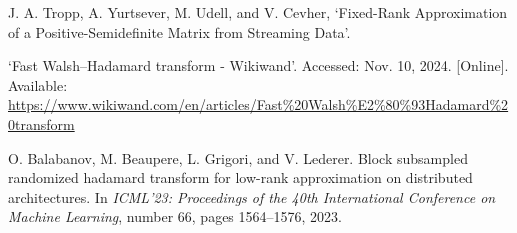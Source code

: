\documentclass[a4paper, 12pt,oneside]{article}
\begin{document}
	\noindent
	[3] J. A. Tropp, A. Yurtsever, M. Udell, and V. Cevher, ‘Fixed-Rank Approximation of a Positive-Semidefinite Matrix from Streaming Data’.

	\noindent
	[4] ‘Fast Walsh–Hadamard transform - Wikiwand’. Accessed: Nov. 10, 2024. [Online]. Available: \url{https://www.wikiwand.com/en/articles/Fast%20Walsh%E2%80%93Hadamard%20transform}
	
	\noindent
	[5] O. Balabanov, M. Beaupere, L. Grigori, and V. Lederer.
	\newblock Block subsampled randomized hadamard transform for low-rank approximation on distributed architectures.
	\newblock In \emph{ICML'23: Proceedings of the 40th International Conference on Machine Learning}, number 66, pages 1564--1576, 2023.
	
	

	
\end{document}
